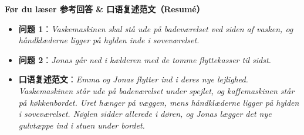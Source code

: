 \begin{answerbox}
\textbf{Før du læser 参考回答 \& 口语复述范文（Resumé）}
\begin{itemize}
  \item \textbf{问题 1}：\textit{Vaskemaskinen skal stå ude på badeværelset ved siden af vasken, og håndklæderne ligger på hylden inde i soveværelset.}
  \item \textbf{问题 2}：\textit{Jonas går ned i kælderen med de tomme flyttekasser til sidst.}
  \item \textbf{口语复述范文}：\textit{Emma og Jonas flytter ind i deres nye lejlighed. Vaskemaskinen står ude på badeværelset under spejlet, og kaffemaskinen står på køkkenbordet. Uret hænger på væggen, mens håndklæderne ligger på hylden i soveværelset. Nøglen sidder allerede i døren, og Jonas lægger det nye gulvtæppe ind i stuen under bordet.}
\end{itemize}
\end{answerbox}
